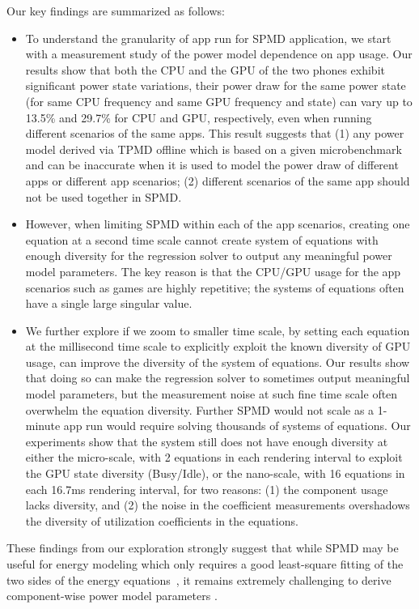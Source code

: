 Our key findings are summarized as follows:
\begin{itemize}
\item To understand the granularity of app run for SPMD application, 
we start with a measurement study of the power model dependence on
app usage. Our results show that both the CPU and the GPU of the 
two phones exhibit significant power state variations, \ie their 
power draw for the same power state (for same CPU frequency and same 
GPU frequency and state) can vary up to  13.5\% and 29.7\% for CPU and GPU, respectively, 
even when running different scenarios of the same apps. 
This result suggests that (1) any power model derived via 
TPMD offline which is based on a given microbenchmark and
can be inaccurate when it is used to model the power draw of 
different apps or different app scenarios;
(2) different scenarios of the same app should not be used together in SPMD. 
    
%
\item 
However, when limiting SPMD within each of the app scenarios, creating 
one equation at a second time scale 
cannot create system of equations with enough diversity for 
the regression solver to output any meaningful power model parameters.
%
The key reason is that the CPU/GPU usage for the app scenarios such 
as games are highly repetitive; 
the systems of equations often have a single large singular value.  
\item 
We further explore if we zoom to smaller time scale, by setting each 
equation at the millisecond time scale
to explicitly exploit the known diversity of GPU usage, can improve 
the diversity of the system of equations. Our results show that doing 
so can 
make the regression solver to sometimes output meaningful model parameters, 
but the measurement noise at such fine time scale often overwhelm 
the equation diversity.
Further SPMD would not scale as a 1-minute app run would require solving thousands of systems of equations. 
Our experiments show that the system still does not have enough diversity  
    at either the micro-scale, \ie with 2 equations in each rendering interval to exploit the GPU state diversity (Busy/Idle), or the nano-scale, \ie with 16 equations in each 16.7ms rendering interval, for two reasons: (1) the component usage lacks diversity,
    and (2) the noise in the coefficient measurements overshadows the diversity of utilization coefficients in the equations. 
\fi
\end{itemize}
    
These findings from our exploration strongly suggest that while SPMD may be useful for energy modeling which only requires a good least-square fitting of the two sides of the energy equations~\cite{sesame:2011}, it remains extremely challenging to derive component-wise power model parameters . 

